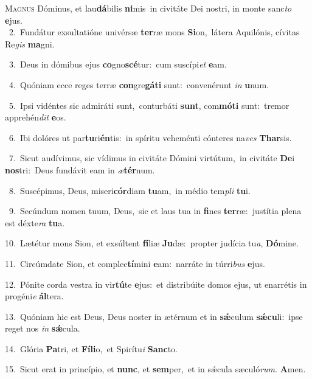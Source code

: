 \lettrine{\initial\textcolor{\initialcolor}{M}}{agnus} Dóminus, et lau\-\textbf{dá}\-bilis \textbf{ni}\-mis~\star in civitáte Dei nostri, in monte sanc\textit{to} \textbf{e}\-jus.\\
{\numbfont\textcolor{\numbcolor}{~2.}}~Fundátur exsultatióne univérsæ \textbf{ter}\-ræ mons \textbf{Si}\-on,~\star látera Aquilónis, cívitas Re\textit{gis} \textbf{ma}\-gni.\par
{\numbfont\textcolor{\numbcolor}{~3.}}~Deus in dómibus ejus \textbf{co}\-gno\-\textbf{scé}\-tur:~\star cum suscípi\textit{et} \textbf{e}\-am.\par
{\numbfont\textcolor{\numbcolor}{~4.}}~Quóniam ecce reges terræ \textbf{con}\-gre\-\textbf{gá}\-\textbf{ti} sunt:~\star convenérunt \textit{in} \textbf{u}\-num.\par
{\numbfont\textcolor{\numbcolor}{~5.}}~Ipsi vidéntes sic admiráti sunt,~\dagger conturbáti \textbf{sunt}\-, com\-\textbf{mó}\-\textbf{ti} sunt:~\star tremor apprehén\textit{dit} \textbf{e}\-os.\par
{\numbfont\textcolor{\numbcolor}{~6.}}~Ibi dolóres ut par\-\textbf{tu}\-ri\-\textbf{én}\-tis:~\star in spíritu veheménti cónteres na\textit{ves} \textbf{Thar}\-sis.\par
{\numbfont\textcolor{\numbcolor}{~7.}}~Sicut audívimus, sic vídimus in civitáte Dómini virtútum,~\dagger in civitáte \textbf{De}\-i \textbf{nos}\-tri:~\star Deus fundávit eam in \textit{æ}\-\textbf{tér}num.\par
{\numbfont\textcolor{\numbcolor}{~8.}}~Suscépimus, Deus, miseri\-\textbf{cór}\-diam \textbf{tu}\-am,~\star in médio tem\textit{pli} \textbf{tu}\-i.\par
{\numbfont\textcolor{\numbcolor}{~9.}}~Secúndum nomen tuum, Deus,~\dagger sic et laus tua in \textbf{fi}\-nes \textbf{ter}\-ræ:~\star justítia plena est déxte\textit{ra} \textbf{tu}\-a.\par
{\numbfont\textcolor{\numbcolor}{10.}}~Lætétur mons Sion, et exsúltent \textbf{fí}\-liæ \textbf{Ju}\-dæ:~\star propter judícia tu\-\textit{a}\-, \textbf{Dó}\-mine.\par
{\numbfont\textcolor{\numbcolor}{11.}}~Circúmdate Sion, et complec\-\textbf{tí}\-mini \textbf{e}\-am:~\star narráte in túrri\textit{bus} \textbf{e}\-jus.\par
{\numbfont\textcolor{\numbcolor}{12.}}~Pónite corda vestra in vir\-\textbf{tú}\-te \textbf{e}\-jus:~\star et distribúite domos ejus, ut enarrétis in progéni\textit{e} \textbf{ál}\-tera.\par
{\numbfont\textcolor{\numbcolor}{13.}}~Quóniam hic est Deus, Deus noster in ætérnum et in \textbf{sǽ}\-culum \textbf{sǽ}\-\textbf{cu}li:~\star ipse reget nos \textit{in} \textbf{sǽ}\-cula.\par
{\numbfont\textcolor{\numbcolor}{14.}}~Glória \textbf{Pa}\-tri, et \textbf{Fí}\-\textbf{li}o,~\star et Spirítu\textit{i} \textbf{Sanc}\-to.\par
{\numbfont\textcolor{\numbcolor}{15.}}~Sicut erat in princípio, et \textbf{nunc}\-, et \textbf{sem}\-per,~\star et in sǽcula sæculó\-\textit{rum}\-. \textbf{A}\-men.\par
